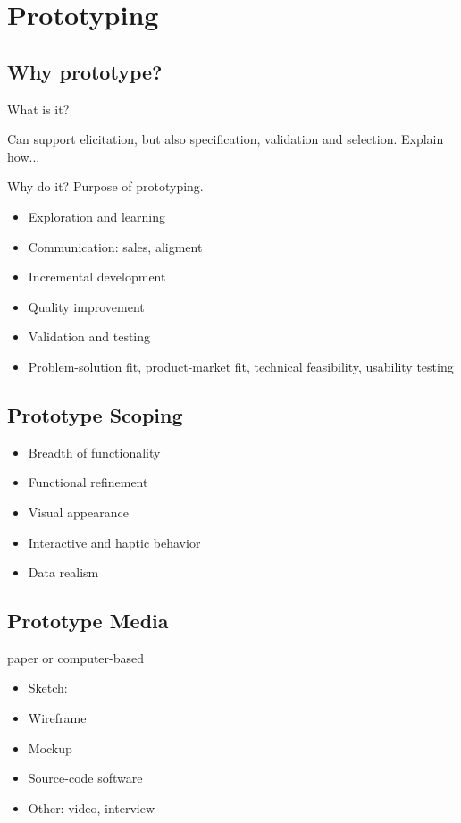 \documentclass{reqengbook}
\begin{document}




\chapter{Prototyping}

\section{Why prototype?}

What is it?

Can support elicitation, but also specification, validation and selection. Explain how...

Why do it? Purpose of prototyping.

\begin{itemize}
  \item Exploration and learning
  \item Communication: sales, aligment
  \item Incremental development
  \item Quality improvement
  \item Validation and testing
  \item Problem-solution fit, product-market fit, technical feasibility, usability testing
\end{itemize}

\section{Prototype Scoping}

\begin{itemize}
  \item Breadth of functionality
  \item Functional refinement
  \item Visual appearance
  \item Interactive and haptic behavior
  \item Data realism
\end{itemize}


\section{Prototype Media}
paper or computer-based
\begin{itemize}
  \item Sketch: 
  \item Wireframe
  \item Mockup
  \item Source-code software
  \item Other: video, interview
\end{itemize}
\end{document}
